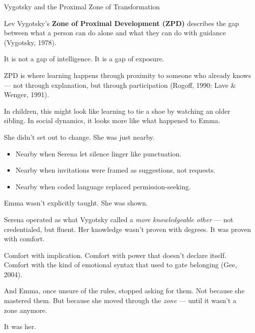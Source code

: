 \begin{PsychologicalSidebar}{Vygotsky and the Proximal Zone of Transformation}

  Lev Vygotsky’s \textbf{Zone of Proximal Development (ZPD)} describes the gap between what 
  a person can do alone and what they can do with guidance (Vygotsky, 1978).
  
  \medskip
  
  It is not a gap of intelligence.  
  It is a gap of exposure.

  \medskip
  
  ZPD is where learning happens through proximity to someone 
  who already knows — not through explanation, but through participation 
  (Rogoff, 1990; Lave \& Wenger, 1991).
  
  \medskip
  
  In children, this might look like learning to tie a shoe by watching an older sibling.  
  In social dynamics, it looks more like what happened to Emma.
  
  \medskip
  
  She didn’t set out to change.  
  She was just nearby.

  \medskip
  
  \begin{itemize}
  \item Nearby when Serena let silence linger like punctuation.
  \item Nearby when invitations were framed as suggestions, not requests.
  \item Nearby when coded language replaced permission-seeking.
  \end{itemize}
  
  \medskip
  
  Emma wasn’t explicitly taught.  
  She was shown.

  \medskip
  
  Serena operated as what Vygotsky called a \textit{more knowledgeable other} —  
  not credentialed, but fluent.  
  Her knowledge wasn’t proven with degrees.  
  It was proven with comfort.

  \medskip

  Comfort with implication.  
  Comfort with power that doesn’t declare itself.  
  Comfort with the kind of emotional syntax that used to gate belonging (Gee, 2004).

  \medskip
  
  And Emma, once unsure of the rules, stopped asking for them.  
  Not because she mastered them.  
  But because she moved through the \textit{zone} —  
  until it wasn’t a zone anymore.

  \medskip
  
  It was her.
  
\end{PsychologicalSidebar}



